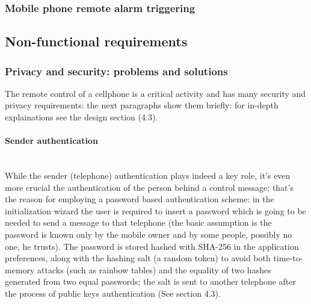 \documentclass[a4paper,12pt]{article}
\begin{document}
\subsubsection{Mobile phone remote alarm triggering}
\subsection{Non-functional requirements}
\subsubsection{Privacy and security: problems and solutions}
\small{The remote control of a cellphone is a critical activity and has many security and privacy requirements: the next paragraphs show them briefly: for in-depth explainations see the design section (4.3).}
\vspace{10pt}
\paragraph{Sender authentication} \hspace{0pt} \\
\small{While the sender (telephone) authentication plays indeed a key role, it's even more crucial the authentication of the person behind a control message; that's the reason for employing a password based authentication scheme: in the initialization wizard the user is required to insert a password which is going to be needed to send a message to that telephone (the basic assumption is the password is known only by the mobile owner and by some people, possibly no one, he trusts). The password is stored hashed with SHA-256 in the application preferences, along with the hashing salt (a random token) to avoid both time-to-memory attacks (such as rainbow tables) and the equality of two hashes generated from two equal passwords; the salt is sent to another telephone after the process of public keys authentication (See section 4.3).}
\end{document}
